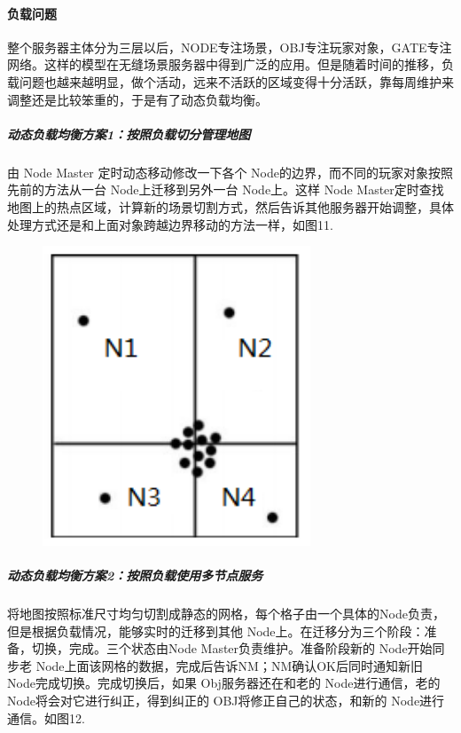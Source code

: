 \documentclass[UTF8,a4paper,8pt]{ctexart}
\begin{document}
			\paragraph{负载问题}整个服务器主体分为三层以后，NODE专注场景，OBJ专注玩家对象，GATE专注网络。这样的模型在无缝场景服务器中得到广泛的应用。但是随着时间的推移，负载问题也越来越明显，做个活动，远来不活跃的区域变得十分活跃，靠每周维护来调整还是比较笨重的，于是有了动态负载均衡。
			
					\subparagraph{动态负载均衡方案1：按照负载切分管理地图}由 Node Master 定时动态移动修改一下各个 Node的边界，而不同的玩家对象按照先前的方法从一台 Node上迁移到另外一台 Node上。这样 Node Master定时查找地图上的热点区域，计算新的场景切割方式，然后告诉其他服务器开始调整，具体处理方式还是和上面对象跨越边界移动的方法一样，如图11.
						\begin{figure}[h] 	
					     	\centering
							\includegraphics[width=8cm,clip]{gameServer11.png} 	
							\label{fig:gameServer11}
				    	\end{figure} 
				
					\subparagraph{动态负载均衡方案2：按照负载使用多节点服务}将地图按照标准尺寸均匀切割成静态的网格，每个格子由一个具体的Node负责，但是根据负载情况，能够实时的迁移到其他 Node上。在迁移分为三个阶段：准备，切换，完成。三个状态由Node Master负责维护。准备阶段新的 Node开始同步老 Node上面该网格的数据，完成后告诉NM；NM确认OK后同时通知新旧 Node完成切换。完成切换后，如果 Obj服务器还在和老的 Node进行通信，老的 Node将会对它进行纠正，得到纠正的 OBJ将修正自己的状态，和新的 Node进行通信。如图12.
				
\end{document}
